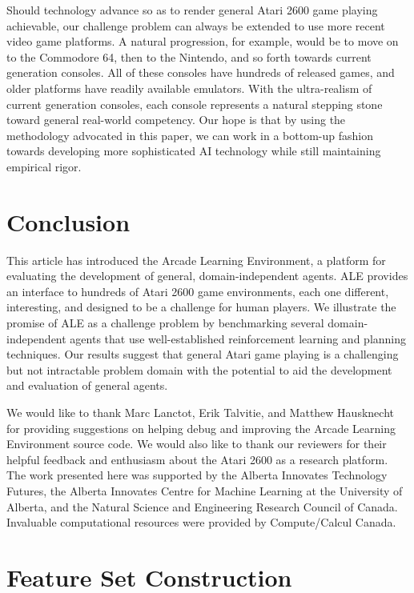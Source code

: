 \documentclass[twoside,11pt]{article}
\begin{document}
Should technology advance so as to render general Atari 2600 game playing achievable, our challenge problem can always be extended to use more recent video game platforms. A natural progression, for example, would be to move on to the Commodore 64, then to the Nintendo, and so forth towards current generation consoles.
All of these consoles have hundreds of released games, and older platforms have readily available emulators.  With the ultra-realism of current generation consoles, each console represents a natural stepping stone toward general real-world competency.  Our hope is that by using the methodology advocated in this paper, we can work in a bottom-up fashion towards developing more sophisticated AI technology while still maintaining empirical rigor.  

\section{Conclusion}
\label{sec:conclusion}

This article has introduced the Arcade Learning Environment, a platform for evaluating the development of general, domain-independent agents.  
ALE provides an interface to hundreds of Atari 2600 game environments, each one different, interesting, and designed to be a challenge for human players.  
We illustrate the promise of ALE as a challenge problem by benchmarking several domain-independent agents that use well-established reinforcement learning and planning techniques.  
Our results suggest that general Atari game playing is a challenging but not intractable problem domain with the potential to aid the development and evaluation of general agents.

\acks
We would like to thank Marc Lanctot, Erik Talvitie, and Matthew Hausknecht for providing suggestions on helping debug and improving the Arcade Learning Environment source code. We would also like to thank our reviewers for their helpful feedback and enthusiasm about the Atari 2600 as a research platform. The work presented here was supported by the Alberta Innovates Technology Futures, the Alberta Innovates Centre for Machine Learning at the University of Alberta, and the Natural Science and Engineering Research Council of Canada. Invaluable computational resources were provided by Compute/Calcul Canada. 


\newpage
\appendix

\section{Feature Set Construction}\label{apdx:feature_sets}
\end{document}
